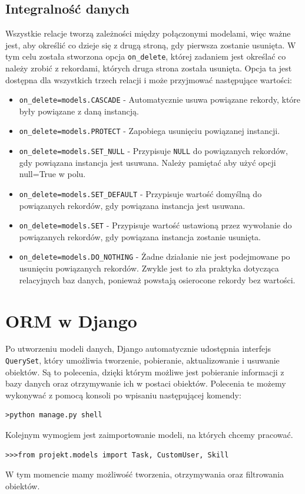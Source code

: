 \documentclass[oneside,polski,logo,indent]{amuthesis}
\begin{document}
\begin{center}
\subsection{Integralność danych}
\end{center}
Wszystkie relacje tworzą zależności między połączonymi modelami, więc ważne jest, aby określić co dzieje się z drugą stroną, gdy pierwsza zostanie usunięta.
W tym celu została stworzona opcja \texttt{on\_delete}, której zadaniem jest określać co należy zrobić z rekordami, których druga strona została usunięta. Opcja ta jest dostępna dla wszystkich trzech relacji i może przyjmować następujące wartości:
\begin{itemize}
\item \texttt{on\_delete=models.CASCADE} - Automatycznie usuwa powiązane rekordy, które były powiązane z daną instancją.
\item \texttt{on\_delete=models.PROTECT} - Zapobiega usunięciu powiązanej instancji.
\item \texttt{on\_delete=models.SET\_NULL} - Przypisuje \texttt{NULL} do powiązanych rekordów, gdy powiązana instancja jest usuwana. Należy pamiętać aby użyć opcji null=True w polu.
\item \texttt{on\_delete=models.SET\_DEFAULT} - Przypisuje wartość domyślną do powiązanych rekordów, gdy powiązana instancja jest usuwana.
\item \texttt{on\_delete=models.SET} - Przypisuje wartość ustawioną przez wywołanie do powiązanych rekordów, gdy powiązana instancja zostanie usunięta.
\item \texttt{on\_delete=models.DO\_NOTHING} - Żadne działanie nie jest podejmowane po usunięciu powiązanych rekordów. Zwykle jest to zła praktyka dotycząca relacyjnych baz danych, ponieważ powstają osierocone rekordy bez wartości.
\end{itemize}
\section{ORM w Django}
Po utworzeniu modeli danych, Django automatycznie udostępnia interfejs \texttt{QuerySet}, który umożliwia tworzenie, pobieranie, aktualizowanie i usuwanie obiektów. Są to polecenia, dzięki którym możliwe jest pobieranie informacji z bazy danych oraz otrzymywanie ich w postaci obiektów. Polecenia te możemy wykonywać z pomocą konsoli po wpisaniu następującej komendy:
\begin{lstlisting}[style=DOS]
>python manage.py shell
\end{lstlisting}
Kolejnym wymogiem jest zaimportowanie modeli, na których chcemy pracować.
\begin{lstlisting}[style=DOS]
>>>from projekt.models import Task, CustomUser, Skill
\end{lstlisting}
W tym momencie mamy możliwość tworzenia, otrzymywania oraz filtrowania obiektów.
\end{document}

